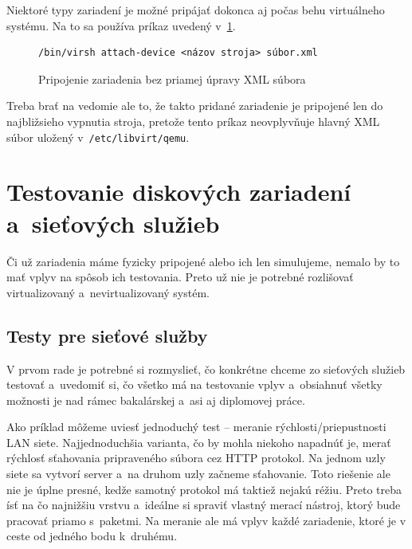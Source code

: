 Niektoré typy zariadení je možné pripájať dokonca aj počas behu virtuálneho
systému. Na to sa používa príkaz uvedený v~\ref{alg:virsh-attach-device}.

\begin{figure}[H]
\begin{lstlisting}
/bin/virsh attach-device <názov stroja> súbor.xml
\end{lstlisting}
\caption{Pripojenie zariadenia bez priamej úpravy XML súbora}
\label{alg:virsh-attach-device}
\end{figure}

Treba brať na vedomie ale to, že takto pridané zariadenie je pripojené len do
najbližsieho vypnutia stroja, pretože tento príkaz neovplyvňuje hlavný XML
súbor uložený v~\texttt{/etc/libvirt/qemu}.

%
%

\chapter{Testovanie diskových zariadení a~sieťových služieb}

Či už zariadenia máme fyzicky pripojené alebo ich len simulujeme, nemalo by to
mať vplyv na spôsob ich testovania. Preto už nie je potrebné rozlišovať
virtualizovaný a~nevirtualizovaný systém.

%
%

\section{Testy pre sieťové služby}

V prvom rade je potrebné si rozmyslieť, čo konkrétne chceme zo sieťových
služieb testovať a~uvedomiť si, čo všetko má na testovanie vplyv a~obsiahnuť
všetky možnosti je nad rámec bakalárskej a~asi aj diplomovej práce.

Ako príklad môžeme uviesť jednoduchý test -- meranie rýchlosti/priepustnosti
LAN siete.  Najjednoduchšia varianta, čo by mohla niekoho napadnúť je, merať
rýchlosť sťahovania pripraveného súbora cez HTTP protokol. Na jednom uzly siete
sa vytvorí server a~na druhom uzly začneme sťahovanie. Toto riešenie ale nie je
úplne presné, kedže samotný protokol má taktiež nejakú réžiu. Preto treba ísť
na čo najnižšiu vrstvu a~ideálne si spraviť vlastný merací nástroj, ktorý bude
pracovať priamo s~paketmi. Na meranie ale má vplyv každé zariadenie, ktoré je
v ceste od jedného bodu k~druhému.

